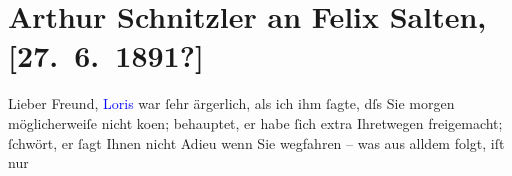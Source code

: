 

\renewcommand{\erwaehntePersonen}{Personen: Richard Beer-Hofmann, Hugo von Hofmannsthal, Felix Salten}
\renewcommand{\erwaehnteOrte}{Orte: Wien}
\renewcommand{\erwaehnteWerke}{Werke: Tagebuch}
\section[Arthur Schnitzler an Felix Salten, {[}27. 6. 1891?{]}]{Arthur Schnitzler an Felix Salten, {[}27. 6. 1891?{]}}
\nopagebreak{}
\rehead{ }\normalsize\beginnumbering{}
\toendnotes[C]{\smallbreak\pagebreak[2]}
\toendnotes[C]{\smallbreak}
\pstart{}{\pb}Lieber Freund,\pend
\pstart
           \textcolor{blue}{Loris}{}\ledrightnote{\textcolor{blue}{Hugo von Hofmannsthal}} war ſehr ärgerlich, als ich ihm ſagte,
               dſs Sie morgen möglicherweiſe nicht ko{\geminationm}en; behauptet, er
               habe ſich extra Ihretwegen frei{\pb}gemacht;
               ſchwört, er ſagt Ihnen nicht Adieu wenn Sie wegfahren – was aus alldem folgt, iſt nur

